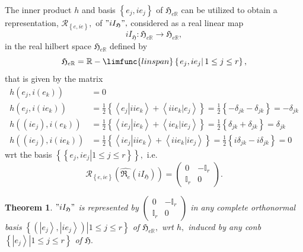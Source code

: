 \documentclass[aps,preprint]{revtex4}
\newtheorem{theorem}{Theorem}
\begin{document}
The inner product $h$ and basis $\left\{ e_{j},ie_{j}\right\} $ of $%
\mathfrak{H}_{e\mathbb{R}}$ can be utilized to obtain a representation, $%
\mathcal{R}_{\left\{ e,ie\right\} },$ of $"iI_{\mathfrak{H}}",$ considered
as a real linear map 
\begin{equation}
iI_{\mathfrak{H}}:\mathfrak{H}_{e\mathbb{R}}\rightarrow \mathfrak{H}_{e%
\mathbb{R}},
\end{equation}%
in the real hilbert space $\mathfrak{H}_{e\mathbb{R}}$ defined by 
\begin{equation}
\mathfrak{H}_{e\mathbb{R}}=\mathbb{R}-\limfunc{linspan}\left\{ \left.
e_{j},ie_{j}\right\vert 1\leq j\leq r\right\} ,
\end{equation}%
that is given by the matrix 
\begin{align}
h\left( e_{j},i\left( e_{k}\right) \right) & =0 \\
h\left( e_{j},i\left( ie_{k}\right) \right) & =\frac{1}{2}\left\{
\left\langle \left. e_{j}\right\vert iie_{k}\right\rangle +\left\langle
\left. iie_{k}\right\vert e_{j}\right\rangle \right\} =\frac{1}{2}\left\{
-\delta _{jk}-\delta _{jk}\right\} =-\delta _{jk} \\
h\left( \left( ie_{j}\right) ,i\left( e_{k}\right) \right) & =\frac{1}{2}%
\left\{ \left\langle \left. ie_{j}\right\vert ie_{k}\right\rangle
+\left\langle \left. ie_{k}\right\vert ie_{j}\right\rangle \right\} =\frac{1%
}{2}\left\{ \delta _{jk}+\delta _{jk}\right\} =\delta _{jk} \\
h\left( \left( ie_{j}\right) ,i\left( ie_{k}\right) \right) & =\frac{1}{2}%
\left\{ \left\langle \left. ie_{j}\right\vert iie_{k}\right\rangle
+\left\langle \left. iie_{k}\right\vert ie_{j}\right\rangle \right\} =\frac{1%
}{2}\left\{ i\delta _{jk}-i\delta _{jk}\right\} =0
\end{align}%
wrt the basis $\left\{ \left\{ \left. e_{j},ie_{j}\right\vert 1\leq j\leq
r\right\} \right\} ,$ i.e. 
\begin{equation}
\mathcal{R}_{\left\{ e,ie\right\} }\left( \widehat{\mathfrak{R}_{e}}\left(
iI_{\mathfrak{H}}\right) \right) =\left( 
\begin{array}{cc}
0 & -\mathbb{I}_{r} \\ 
\mathbb{I}_{r} & 0%
\end{array}%
\right) .
\end{equation}

\begin{theorem}
$"iI_{\mathfrak{H}}"$ is represented by $\left( 
\begin{array}{cc}
0 & -\mathbb{I}_{r} \\ 
\mathbb{I}_{r} & 0%
\end{array}%
\right) $ in \emph{any }complete orthonormal basis $\left\{ \left. \left(
\left\vert e_{j}\right\rangle ,\left\vert ie_{j}\right\rangle \right)
\right\vert 1\leq j\leq r\right\} $ of $\mathfrak{H}_{e\mathbb{R}},$ wrt $h,$
induced by \emph{any} conb $\left\{ \left. \left\vert e_{j}\right\rangle
\right\vert 1\leq j\leq r\right\} $ of $\mathfrak{H.}$
\end{theorem}
\end{document}
